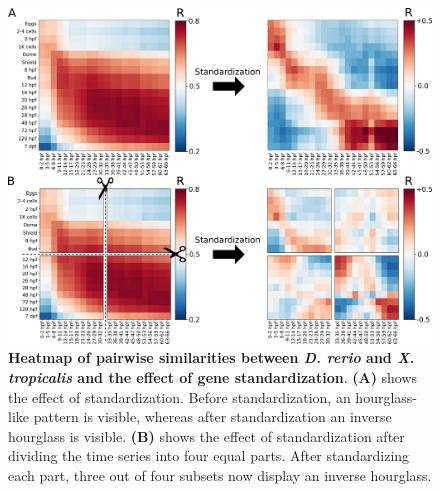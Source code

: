 \begin{figure}[H]
    \includegraphics[width=\linewidth]{ch.hourglass/images/normalisation.png}
    \caption{\textbf{Heatmap of pairwise similarities between \textit{D. rerio} and \textit{X. tropicalis} and the effect of gene standardization}. \textbf{(A)} shows the effect of standardization. Before standardization, an hourglass-like pattern is visible, whereas after standardization an inverse hourglass is visible. \textbf{(B)} shows the effect of standardization after dividing the time series into four equal parts. After standardizing each part, three out of four subsets now display an inverse hourglass. }
    \label{fig:standardization}
\end{figure}


